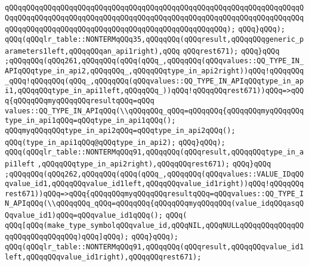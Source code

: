 \verb|qQQqqQQqqQQqqQQqqQQqqQQqqQQqqQQqqQQqqQQqqQQqqQQqqQQqqQQqqQQqqQQqqQQqqQQqqQQqqQQqqQQqqQQqqQQqqQQqqQQqqQQqqQQqqQQqqQQqqQQqqQQqqQQqqQQqqQQqqQQqqQQqqQQqqQQqqQQqqQQqqQQqqQQqqQQqqQQqqQQqqQQqqQQqqQQq);|\newline
\verb|qQQq}qQQq);|\newline
\verb|qQQq(qQQqlr_table::NONTERMqQQq35,qQQqqQQq(qQQqresult,qQQqqQQqgeneric_parameters1left,qQQqqQQqan_api1right),qQQq|\newline
\verb|qQQqrest671);|\newline
\verb|qQQq}qQQq|\newline
\verb|;qQQqqQQq(qQQq261,qQQqqQQq(qQQq(qQQq_,qQQqqQQq(qQQqvalues::QQ_TYPE_IN_APIqQQqtype_in_api2,qQQqqQQq_,qQQqqQQqtype_in_api2right))qQQq!qQQqqQQq_qQQq!qQQqqQQq(qQQq_,qQQqqQQq(qQQqvalues::QQ_TYPE_IN_APIqQQqtype_in_api1,qQQqqQQqtype_in_api1left,qQQqqQQq_))qQQq!qQQqqQQqrest671))qQQq=>qQQq{qQQqqQQqmyqQQqqQQqresultqQQq=qQQq|\newline
\verb|values::QQ_TYPE_IN_APIqQQq(\\qQQqqQQq_qQQq=qQQqqQQq{qQQqqQQqmyqQQqqQQqtype_in_api1qQQq=qQQqtype_in_api1qQQq();|\newline
\verb|qQQqmyqQQqqQQqtype_in_api2qQQq=qQQqtype_in_api2qQQq();|\newline
\verb|qQQq(type_in_api1qQQq@qQQqtype_in_api2);|\newline
\verb|qQQq}qQQq);|\newline
\verb|qQQq(qQQqlr_table::NONTERMqQQq91,qQQqqQQq(qQQqresult,qQQqqQQqtype_in_api1left|\newline
\verb|,qQQqqQQqtype_in_api2right),qQQqqQQqrest671);|\newline
\verb|qQQq}qQQq|\newline
\verb|;qQQqqQQq(qQQq262,qQQqqQQq(qQQq(qQQq_,qQQqqQQq(qQQqvalues::VALUE_IDqQQqvalue_id1,qQQqqQQqvalue_id1left,qQQqqQQqvalue_id1right))qQQq!qQQqqQQqrest671))qQQq=>qQQq{qQQqqQQqmyqQQqqQQqresultqQQq=qQQqvalues::QQ_TYPE_IN_APIqQQq(\\qQQqqQQq_qQQq=qQQqqQQq{qQQqqQQqmyqQQqqQQq(value_idqQQqasqQQqvalue_id1)qQQq=qQQqvalue_id1qQQq();|\newline
\verb|qQQq(|\newline
\verb|qQQq[qQQq(make_type_symbolqQQqvalue_id,qQQqNIL,qQQqNULLqQQqqQQqqQQqqQQqqQQqqQQqqQQqqQQq)qQQq]qQQq);|\newline
\verb|qQQq}qQQq);|\newline
\verb|qQQq(qQQqlr_table::NONTERMqQQq91,qQQqqQQq(qQQqresult,qQQqqQQqvalue_id1left,qQQqqQQqvalue_id1right),qQQqqQQqrest671);|\newline
